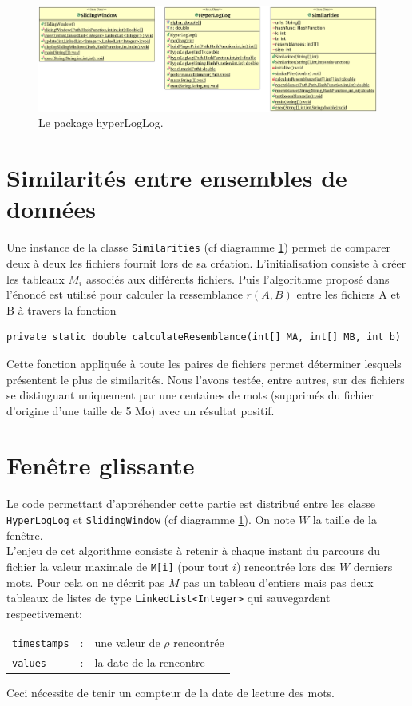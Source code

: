 \documentclass[12pt,a4paper,titlepage]{article}
\newcommand{\class}[1]{\texttt{#1}}
\begin{document}
\begin{figure}
	\label{fig:hyperLogLogPackage}
	\centering
	\includegraphics[scale=0.50, angle=90]{../Java Workspace/Test Hash/hyperLogLogPackage.png}
	\caption{Le package hyperLogLog.}
\end{figure}


\newpage
\section{Similarités entre ensembles de données}
Une instance de la classe \class{Similarities} (cf diagramme \ref{fig:hyperLogLogPackage}) permet de comparer deux à deux les fichiers fournit lors de sa création. L'initialisation consiste à créer les tableaux $M_i$ associés aux différents fichiers. Puis l'algorithme proposé dans l'énoncé est utilisé pour calculer la ressemblance $r(A,B)$ entre les fichiers A et B à travers la fonction
\begin{lstlisting}
private static double calculateResemblance(int[] MA, int[] MB, int b)
\end{lstlisting}
Cette fonction appliquée à toute les paires de fichiers permet déterminer lesquels présentent le plus de similarités. Nous l'avons testée, entre autres, sur des fichiers se distinguant uniquement par une centaines de mots (supprimés du fichier d'origine d'une taille de 5 Mo) avec un résultat positif.


\newpage
\section{Fenêtre glissante}
Le code permettant d'appréhender cette partie est distribué entre les classe \class{HyperLogLog} et \class{SlidingWindow} (cf diagramme \ref{fig:hyperLogLogPackage}).
On note $W$ la taille de la fenêtre.\\
L'enjeu de cet algorithme consiste à retenir à chaque instant du parcours du fichier la valeur maximale de \class{M[i]} (pour tout $i$) rencontrée lors des $W$ derniers mots. Pour cela on ne décrit pas $M$ pas un tableau d'entiers mais pas deux tableaux de listes de type \class{LinkedList<Integer>} qui sauvegardent respectivement:\\
\begin{tabular}{lcl}
\class{timestamps} &:& une valeur de $\rho$ rencontrée \\
\class{values} 	   &:& la date de la rencontre
\end{tabular}
Ceci nécessite de tenir un compteur de la date de lecture des mots.
\end{document}
